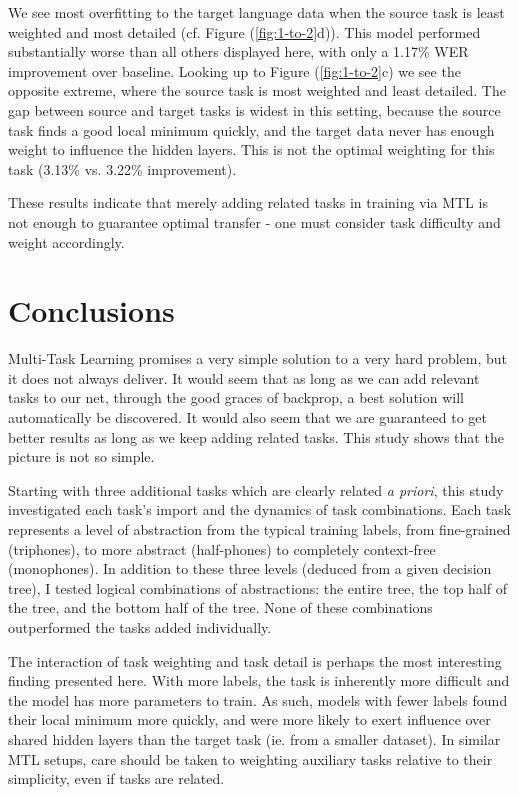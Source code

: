 \documentclass[a4paper]{article}
\begin{document}
We see most overfitting to the target language data when the source task is least weighted and most detailed (cf. Figure (\ref{fig:1-to-2}d)). This model performed substantially worse than all others displayed here, with only a 1.17\% WER improvement over baseline. Looking up to Figure (\ref{fig:1-to-2}c) we see the opposite extreme, where the source task is most weighted and least detailed. The gap between source and target tasks is widest in this setting, because the source task finds a good local minimum quickly, and the target data never has enough weight to influence the hidden layers. This is not the optimal weighting for this task (3.13\% vs. 3.22\% improvement).

These results indicate that merely adding related tasks in training via MTL is not enough to guarantee optimal transfer - one must consider task difficulty and weight accordingly. 




\section{Conclusions}

Multi-Task Learning promises a very simple solution to a very hard problem, but it does not always deliver. It would seem that as long as we can add relevant tasks to our net, through the good graces of backprop, a best solution will automatically be discovered. It would also seem that we are guaranteed to get better results as long as we keep adding related tasks. This study shows that the picture is not so simple.

Starting with three additional tasks which are clearly related \textit{a priori}, this study investigated each task's import and the dynamics of task combinations. Each task represents a level of abstraction from the typical training labels, from fine-grained (triphones), to more abstract (half-phones) to completely context-free (monophones). In addition to these three levels (deduced from a given decision tree), I tested logical combinations of abstractions: the entire tree, the top half of the tree, and the bottom half of the tree. None of these combinations outperformed the tasks added individually.

The interaction of task weighting and task detail is perhaps the most interesting finding presented here. With more labels, the task is inherently more difficult and the model has more parameters to train. As such, models with fewer labels found their local minimum more quickly, and were more likely to exert influence over shared hidden layers than the target task (ie. from a smaller dataset). In similar MTL setups, care should be taken to weighting auxiliary tasks relative to their simplicity, even if tasks are related.
\end{document}
